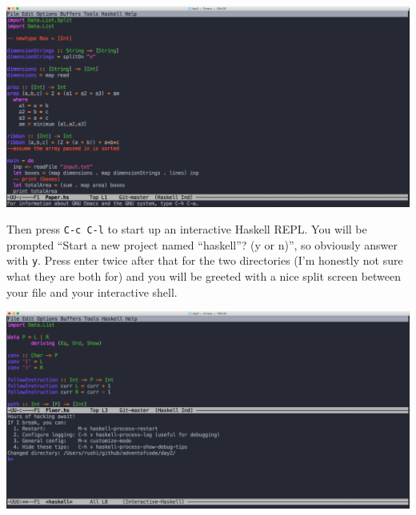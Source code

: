 \documentclass[12pt]{article}
\begin{document}
\begin{center}
\includegraphics[width=7in]{two}
\end{center}

Then press \texttt{C-c\ C-l} to start up an interactive Haskell REPL.
You will be prompted ``Start a new project named ``haskell''? (y or
n)'', so obviously answer with \texttt{y}. Press enter twice after that
for the two directories (I'm honestly not sure what they are both for)
and you will be greeted with a nice split screen between your file and
your interactive shell.

\begin{center}
\includegraphics[width=7in]{three}
\end{center}
\end{document}
